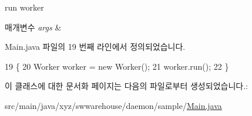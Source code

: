 run worker 


\begin{DoxyParams}{매개변수}
{\em args} & \\
\hline
\end{DoxyParams}


Main.\-java 파일의 19 번째 라인에서 정의되었습니다.


\begin{DoxyCode}
19                                            \{
20         Worker worker = \textcolor{keyword}{new} Worker();
21         worker.run();
22     \}
\end{DoxyCode}


이 클래스에 대한 문서화 페이지는 다음의 파일로부터 생성되었습니다.\-:\begin{DoxyCompactItemize}
\item 
src/main/java/xyz/swwarehouse/daemon/sample/\hyperlink{_main_8java}{Main.\-java}\end{DoxyCompactItemize}
